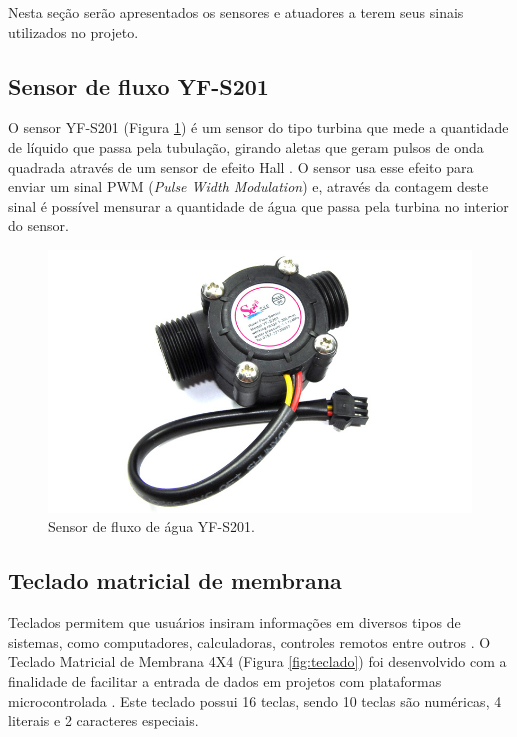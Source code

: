 Nesta seção serão apresentados os sensores e atuadores a terem seus sinais utilizados no projeto. 

\subsection{Sensor de fluxo YF-S201} \label{sec:sensor}

O sensor YF-S201 (Figura \ref{fig:sensor}) é um sensor do tipo turbina que mede a quantidade de líquido que passa pela tubulação, girando aletas que
geram pulsos de onda quadrada através de um sensor de efeito Hall \cite{roque2018sistema}. O
sensor usa esse efeito para enviar um sinal PWM (\textit{Pulse Width Modulation}) e, através da contagem deste sinal é possível mensurar a quantidade de água que passa pela turbina no interior do sensor. \cite{ms2017automaccao}

\begin{figure}[htbp]
		\centering
		\includegraphics[scale=0.3]{figuras/yf-s201.jpg}
		\caption{Sensor de fluxo de água YF-S201.}
		\label{fig:sensor}
\end{figure}

\newpage

\subsection{Teclado matricial de membrana} \label{sec:teclado}

Teclados permitem que usuários insiram informações em diversos tipos de sistemas, como computadores, calculadoras, controles remotos entre outros \cite{teclado-matricial-1}. O Teclado Matricial de Membrana 4X4 (Figura \ref{fig:teclado}) foi desenvolvido com a finalidade de facilitar a entrada de dados em projetos com plataformas microcontrolada \cite{teclado-matricial}. Este teclado possui 16 teclas, sendo 10 teclas são numéricas, 4 literais e 2 caracteres especiais.

